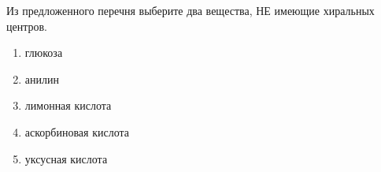 Из предложенного перечня выберите два вещества, НЕ имеющие хиральных центров.

\begin{enumerate}
\item глюкоза
\item анилин
\item лимонная кислота
\item аскорбиновая кислота
\item уксусная кислота
\end{enumerate}
